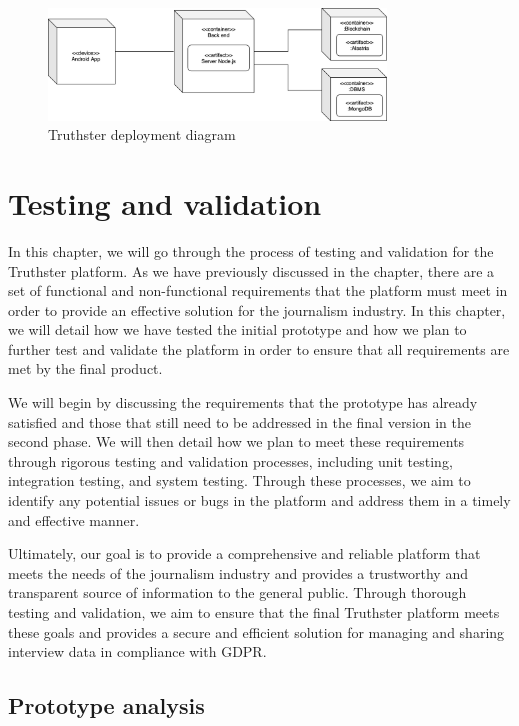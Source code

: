 \documentclass[target=mst,aauheader=]{thud}
\begin{document}
\begin{figure}
    \centering
    \includegraphics[width=0.8\textwidth]{images/deploymentDiagram.png}
    \caption{Truthster deployment diagram}
    \label{fig:deploymentDiagram}
\end{figure}

\chapter{Testing and validation}
\label{chapter:testingAndValidation}

In this chapter, we will go through the process of testing and validation for the Truthster platform. As we have previously discussed in the  chapter, there are a set of functional and non-functional requirements that the platform must meet in order to provide an effective solution for the journalism industry. In this chapter, we will detail how we have tested the initial prototype and how we plan to further test and validate the platform in order to ensure that all requirements are met by the final product.\par
We will begin by discussing the requirements that the prototype has already satisfied and those that still need to be addressed in the final version in the second phase. We will then detail how we plan to meet these requirements through rigorous testing and validation processes, including unit testing, integration testing, and system testing. Through these processes, we aim to identify any potential issues or bugs in the platform and address them in a timely and effective manner.\par
Ultimately, our goal is to provide a comprehensive and reliable platform that meets the needs of the journalism industry and provides a trustworthy and transparent source of information to the general public. Through thorough testing and validation, we aim to ensure that the final Truthster platform meets these goals and provides a secure and efficient solution for managing and sharing interview data in compliance with GDPR.

\section{Prototype analysis}
\end{document}

